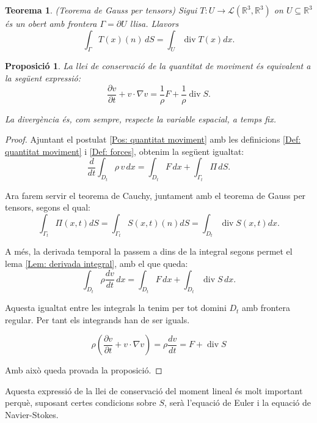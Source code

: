 \documentclass{article}
\numberwithin{equation}{section}
\DeclareMathOperator{\diver}{div}
\newtheorem{teorema}{Teorema}[section]
\newtheorem{proposicio}{Proposici\'{o}}[section]
\begin{document}
\begin{teorema}
(Teorema de Gauss per tensors) Sigui $T:U\rightarrow\mathcal{L}(\mathbb{R}^3,\mathbb{R}^3)$ on $U\subseteq\mathbb{R}^3$ \'{e}s un obert amb frontera $\Gamma=\partial U$ llisa. Llavors
\begin{equation}
\int_{\Gamma}T(x)(n)\,dS=\int_U\diver T(x)dx.
\end{equation}
\end{teorema}

\begin{proposicio}\label{Pro: conservacio moment}
La llei de conservaci\'{o} de la quantitat de moviment \'{e}s equivalent a la seg\"{u}ent expressi\'{o}:
\begin{equation}\label{Equ. conservacio moment}
\frac{\partial v}{\partial t}+v\cdot\nabla v=\frac{1}{\rho}F+\frac{1}{\rho}\diver S.
\end{equation}

La diverg\`{e}ncia \'{e}s, com sempre, respecte la variable espacial, a temps fix.
\end{proposicio}
\begin{proof}
Ajuntant el postulat \ref{Pos: quantitat moviment} amb les definicions \ref{Def: quantitat moviment} i \ref{Def: forces}, obtenim la seg\"{u}ent igualtat:
\[\frac{d}{dt}\int_{D_t}\rho\,v\,dx=\int_{D_t}F\,dx+\int_{\Gamma_t}\Pi\,dS.\]

Ara farem servir el teorema de Cauchy, juntament amb el teorema de Gauss per tensors, segons el qual:
\[\int_{\Gamma_t}\Pi(x,t)dS=\int_{\Gamma_t}S(x,t)(n)dS=\int_{D_t}\diver S(x,t)dx.\]

A m\'{e}s, la derivada temporal la passem a dins de la integral segons permet el lema \ref{Lem: derivada integral}, amb el que queda:
\[\int_{D_t}\rho\frac{dv}{dt}\,dx=\int_{D_t}F\,dx+\int_{D_t}\diver S\,dx.\]

Aquesta igualtat entre les integrals la tenim per tot domini $D_t$ amb frontera regular. Per tant els integrands han de ser iguals.

\[\rho\left(\frac{\partial v}{\partial t}+v\cdot\nabla v\right)=\rho\frac{dv}{dt}=F+\diver S\]

Amb aix\`{o} queda provada la proposici\'{o}.
\end{proof}

Aquesta expressi\'{o} de la llei de conservaci\'{o} del moment lineal \'{e}s molt important perqu\`{e}, suposant certes condicions sobre $S$, ser\`{a} l'equaci\'{o} de Euler i la equaci\'{o} de Navier-Stokes.
\end{document}
